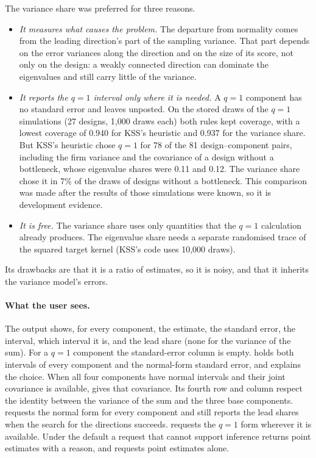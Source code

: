 The variance share was preferred for three reasons.
\begin{itemize}
\item \emph{It measures what causes the problem.} The departure from normality comes
from the leading direction's part of the sampling variance. That part depends on the
error variances along the direction and on the size of its score, not only on the
design: a weakly connected direction can dominate the eigenvalues and still carry
little of the variance.
\item \emph{It reports the $q=1$ interval only where it is needed.} A $q=1$ component
has no standard error and leaves  unposted. On the stored draws of the
$q=1$ simulations (27 designs, 1,000 draws each) both rules kept coverage, with a
lowest coverage of 0.940 for KSS's heuristic and 0.937 for the variance share. But
KSS's heuristic chose $q=1$ for 78 of the 81 design--component pairs, including the firm variance
and the covariance of a design without a bottleneck, whose eigenvalue shares were 0.11
and 0.12. The variance share chose it in 7\% of the draws of designs without a
bottleneck. This comparison was made after the results of those simulations were
known, so it is development evidence.
\item \emph{It is free.} The variance share uses only quantities that the $q=1$
calculation already produces. The eigenvalue share needs a separate randomised trace
of the squared target kernel (KSS's code uses 10,000 draws).
\end{itemize}
Its drawbacks are that it is a ratio of estimates, so it is noisy, and that it
inherits the variance model's errors.

\paragraph{What the user sees.}
The output shows, for every component, the estimate, the standard error, the interval,
which interval it is, and the lead share (none for the variance of the sum). For a $q=1$ component the standard-error
column is empty.  holds both intervals of every component
and the normal-form standard error, and  explains the choice.
When all four components have normal intervals and their joint covariance is
available,  gives that covariance. Its fourth row and column respect the
identity between the variance of the sum and the three base components.
 requests the normal form for every component and still
reports the lead shares when the search for the directions succeeds.  requests the $q=1$ form wherever it is
available. Under the default a request that cannot support inference returns point
estimates with a reason, and  requests point estimates alone.

